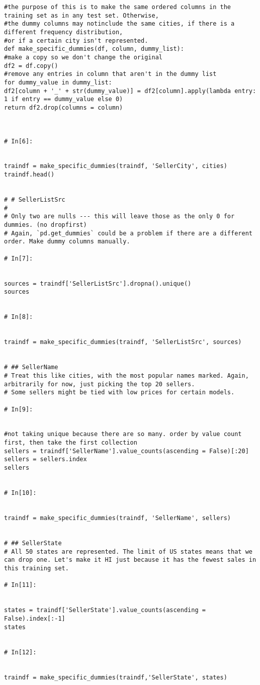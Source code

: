 \begin{verbatim}
#the purpose of this is to make the same ordered columns in the training set as in any test set. Otherwise,
#the dummy columns may notinclude the same cities, if there is a different frequency distribution,
#or if a certain city isn't represented.
def make_specific_dummies(df, column, dummy_list):
#make a copy so we don't change the original
df2 = df.copy()
#remove any entries in column that aren't in the dummy list
for dummy_value in dummy_list:
df2[column + '_' + str(dummy_value)] = df2[column].apply(lambda entry: 1 if entry == dummy_value else 0)
return df2.drop(columns = column)



# In[6]:


traindf = make_specific_dummies(traindf, 'SellerCity', cities)
traindf.head()


# # SellerListSrc
# 
# Only two are nulls --- this will leave those as the only 0 for dummies. (no dropfirst)
# Again, `pd.get_dummies` could be a problem if there are a different order. Make dummy columns manually.

# In[7]:


sources = traindf['SellerListSrc'].dropna().unique()
sources


# In[8]:


traindf = make_specific_dummies(traindf, 'SellerListSrc', sources)


# ## SellerName
# Treat this like cities, with the most popular names marked. Again, arbitrarily for now, just picking the top 20 sellers.
# Some sellers might be tied with low prices for certain models.

# In[9]:


#not taking unique because there are so many. order by value count first, then take the first collection
sellers = traindf['SellerName'].value_counts(ascending = False)[:20]
sellers = sellers.index
sellers


# In[10]:


traindf = make_specific_dummies(traindf, 'SellerName', sellers)


# ## SellerState
# All 50 states are represented. The limit of US states means that we can drop one. Let's make it HI just because it has the fewest sales in this training set.

# In[11]:


states = traindf['SellerState'].value_counts(ascending = False).index[:-1]
states


# In[12]:


traindf = make_specific_dummies(traindf,'SellerState', states)



\end{verbatim}
